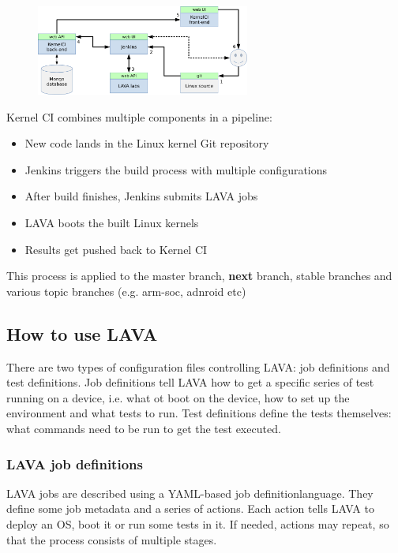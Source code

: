 \documentclass[10pt, a5paper]{article}
\begin{document}
\begin{center}
\begin{figure}[h!]
  \centering
  \includegraphics[width=7cm]{10_2018_Shadura1.png}
  \label{Shadura1}
\end{figure}
\end{center} 

Kernel CI combines multiple components in a pipeline:
\begin{itemize}
\item New code lands in the Linux kernel Git repository
\item Jenkins triggers the build process with multiple configurations
\item After build finishes, Jenkins submits LAVA jobs
\item LAVA boots the built Linux kernels
\item Results get pushed back to Kernel CI
\end{itemize}

This process is applied to the master branch, \textbf{next} branch, stable branches and various topic branches (e.g. arm-soc, adnroid etc)

\subsection*{How to use LAVA}

There are two types of configuration files controlling LAVA: job definitions and test definitions. Job definitions tell LAVA how to get a specific series of test running on a device, i.e. what ot boot on the device, how to set up the environment and what tests to run. Test definitions define the tests themselves: what commands need to be run to get the test executed.

\subsubsection*{LAVA job definitions}

LAVA jobs are described using a YAML-based job definition\linebreak language. They define some job metadata and a series of actions. Each action tells LAVA to deploy an OS, boot it or run some tests in it. If needed, actions may repeat, so that the process consists of multiple stages.
\end{document}
